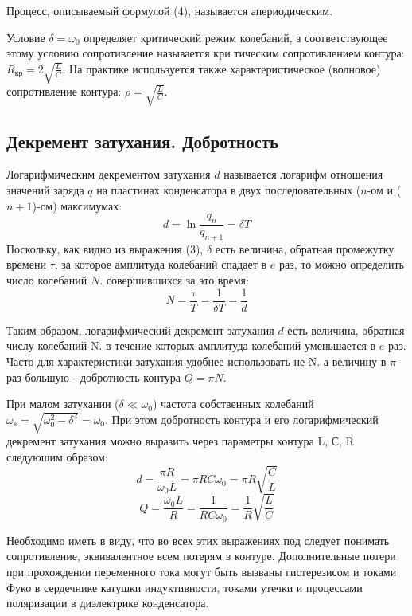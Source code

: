 Процесс, описываемый формулой (4), называется апериодическим.


Условие $\delta=\omega_0$ определяет критический режим колебаний, а соответствующее этому условию сопротивление называется кри 
тическим сопротивлением контура: $R_{\text{кр}}=2\sqrt{\frac{L}{C}}$. На практике используется также характеристическое (волновое) сопротивление 
контура: $\rho=\sqrt{\frac{L}{C}}$.

\subsection{Декремент затухания. Добротность}
Логарифмическим декрементом затухания $d$ называется логарифм отношения значений заряда $q$ на пластинах конденсатора в двух последовательных ($n$-ом и ($n+1$)-ом) максимумах:
\begin{equation}
	d=\ln{\frac{q_n}{q_{n+1}}}=\delta T
\end{equation}
Поскольку, как видно из выражения (3), $\delta$ есть величина, обратная промежутку времени $\tau$, за которое амплитуда колебаний спадает в $e$ раз, то можно определить число колебаний $N$. совершившихся за это время:
\begin{equation}
	N=\frac{\tau}{T}=
		\frac{1}{\delta T}=
			\frac{1}{d}
\end{equation}

Таким образом, логарифмический декремент затухания $d$ есть величина, обратная числу колебаний N. в течение которых амплитуда колебаний уменьшается в $e$ раз.
Часто для характеристики затухания удобнее использовать не N. а величину в $\pi$ раз большую - добротность контура $Q=\pi N$.
 
При малом затухании ($\delta \ll \omega_0$) частота собственных колебаний 
$\omega_s=\sqrt{\omega_0^2 - \delta^2}=\omega_0$. 
При этом добротность контура и его
логарифмический декремент затухания можно выразить через параметры контура L, С, R следующим образом:
\begin{equation}
	d=\frac{\pi R}{\omega_0 L}=\pi RC\omega_0=\pi R\sqrt{\frac{C}{L}}
\end{equation}
\begin{equation}
	Q=\frac{\omega_0 L}{R}=\frac{1}{RC\omega_0}=\frac{1}{R}\sqrt{\frac{L}{C}}
\end{equation}

Необходимо иметь в виду, что во всех этих выражениях под следует понимать сопротивление, эквивалентное всем потерям в контуре. Дополнительные потери при прохождении переменного тока могут быть вызваны гистерезисом и токами Фуко в сердечнике катушки индуктивности, токами утечки и процессами поляризации в диэлектрике конденсатора.

